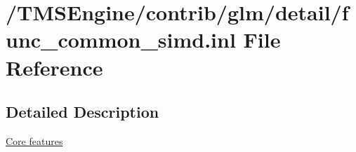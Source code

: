 \hypertarget{func__common__simd_8inl}{}\section{/\+T\+M\+S\+Engine/contrib/glm/detail/func\+\_\+common\+\_\+simd.inl File Reference}
\label{func__common__simd_8inl}


\subsection{Detailed Description}
\hyperlink{group__core}{Core features} 